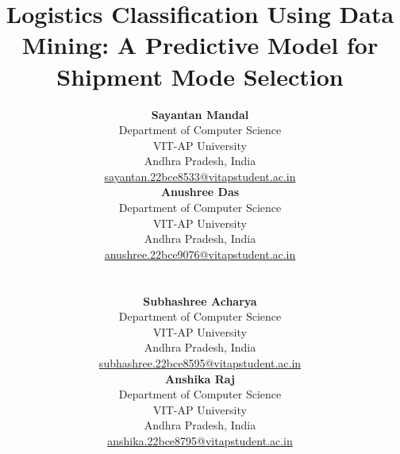 \documentclass[conference]{IEEEtran}
\begin{document}
\title{Logistics Classification Using Data Mining: A Predictive Model for Shipment Mode Selection}



\author{
    \begin{minipage}[t]{0.45\textwidth} 
        \centering
        \textbf{Sayantan Mandal}\\
        Department of Computer Science\\
        VIT-AP University\\
        Andhra Pradesh, India\\
        \href{mailto:sayantan.22bce8533@vitapstudent.ac.in}{sayantan.22bce8533@vitapstudent.ac.in}
    \end{minipage}%
    \hspace{0.5cm} %
    \begin{minipage}[t]{0.45\textwidth} 
        \centering
        \textbf{Anushree Das}\\
        Department of Computer Science\\
        VIT-AP University\\
        Andhra Pradesh, India\\
        \href{mailto:anushree.22bce9076@vitapstudent.ac.in}{anushree.22bce9076@vitapstudent.ac.in}
    \end{minipage}\\[0.5cm] %
    
    \begin{minipage}[t]{0.45\textwidth} 
        \centering
        \textbf{Subhashree Acharya}\\
        Department of Computer Science\\
        VIT-AP University\\
        Andhra Pradesh, India\\
        \href{mailto:subhashree.22bce8595@vitapstudent.ac.in}{subhashree.22bce8595@vitapstudent.ac.in}
    \end{minipage}%
    \hspace{0.5cm} %
    \begin{minipage}[t]{0.45\textwidth} 
        \centering
        \textbf{Anshika Raj}\\
        Department of Computer Science\\
        VIT-AP University\\
        Andhra Pradesh, India\\
        \href{mailto:anshika.22bce8795@vitapstudent.ac.in}{anshika.22bce8795@vitapstudent.ac.in}
    \end{minipage}
}
\end{document}
